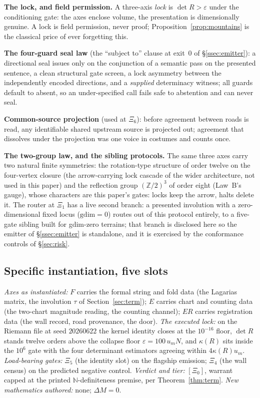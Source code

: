 \documentclass[twocolumn,10pt]{article}
\theoremstyle{plain}
\theoremstyle{definition}
\newcommand{\tXi}{[\Xi_0]}
\newcommand{\N}{\mathbb{N}}
\begin{document}
\textbf{The lock, and field permission.} A three-axis \emph{lock} is $\det R>\varepsilon$ under the conditioning gate: the axes enclose volume, the presentation is dimensionally genuine. A lock is field permission, never proof; Proposition~\ref{prop:mountains} is the classical price of ever forgetting this.

\textbf{The four-guard seal law} (the ``subject to'' clause at exit~0 of \S\ref{ssec:emitter}): a directional seal issues only on the conjunction of a semantic pass on the presented sentence, a clean structural gate screen, a lock asymmetry between the independently encoded directions, and a \emph{supplied} determinacy witness; all guards default to absent, so an under-specified call fails safe to abstention and can never seal.

\textbf{Common-source projection} (used at $\Xi_6$): before agreement between roads is read, any identifiable shared upstream source is projected out; agreement that dissolves under the projection was one voice in costumes and counts once.

\textbf{The two-group law, and the sibling protocols.} The same three axes carry two natural finite symmetries: the rotation-type structure of order twelve on the four-vertex closure (the arrow-carrying lock cascade of the wider architecture, not used in this paper) and the reflection group $(\mathbb Z/2)^3$ of order eight (Law~B's gauge), whose characters are this paper's gates: locks keep the arrow, halts delete it. The router at $\Xi_1$ has a live second branch: a presented involution with a zero-dimensional fixed locus ($\mathrm{gdim}=0$) routes out of this protocol entirely, to a five-gate sibling built for gdim-zero terrains; that branch is disclosed here so the emitter of \S\ref{ssec:emitter} is standalone, and it is exercised by the conformance controls of \S\ref{sec:risk}.

\subsection{Specific instantiation, five slots}
\emph{Axes as instantiated:} $F$ carries the formal string and fold data (the Lagarias matrix, the involution $\tau$ of Section~\ref{sec:term}); $E$ carries chart and counting data (the two-chart magnitude reading, the counting channel); $ER$ carries registration data (the wall record, road provenance, the door). \emph{The executed lock:} on the Riemann file at seed $20260622$ the kernel identity closes at the $10^{-16}$ floor, $\det R$ stands twelve orders above the collapse floor $\varepsilon=100\,u_mN$, and $\kappa(R)$ sits inside the $10^6$ gate with the four determinant estimators agreeing within $4\kappa(R)u_m$. \emph{Load-bearing gates:} $\Xi_5$ (the identity slot) on the flagship emission; $\Xi_4$ (the wall census) on the predicted negative control. \emph{Verdict and tier:} $\tXi$, warrant capped at the printed $\N$-definiteness premise, per Theorem~\ref{thm:term}. \emph{New mathematics authored:} none; $\Delta M=0$.
\end{document}
